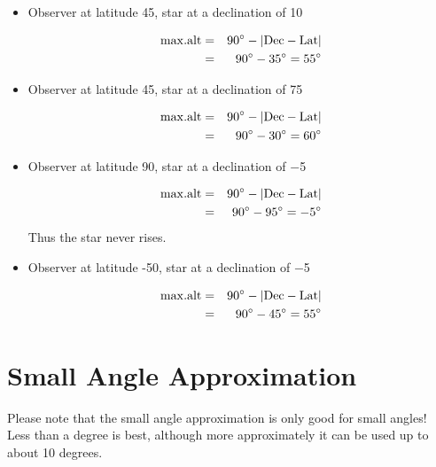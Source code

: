 \documentclass[12pt, preprint]{aastex}
\begin{document}
\begin{itemize}
  \item Observer at latitude 45\degree, star at a declination of
    10\degree

    \begin{answer}
      \begin{eqnarray}
      {\rm max. alt} &=& 90{}^\circ - \left|{\rm Dec} - {\rm
        Lat}\right| \cr
      &=& 90{}^\circ - 35{}^\circ = 55{}^\circ
      \end{eqnarray}
    \end{answer}
  \item Observer at latitude 45\degree, star at a declination of
    75\degree

    \begin{answer}
      \begin{eqnarray}
      {\rm max. alt} &=& 90{}^\circ - \left|{\rm Dec} - {\rm
        Lat}\right| \cr
      &=& 90{}^\circ - 30{}^\circ = 60{}^\circ
      \end{eqnarray}
    \end{answer}
  \item Observer at latitude 90\degree, star at a declination of
    $-$5\degree

    \begin{answer}
      \begin{eqnarray}
      {\rm max. alt} &=& 90{}^\circ - \left|{\rm Dec} - {\rm
        Lat}\right| \cr
      &=& 90{}^\circ - 95{}^\circ = -5{}^\circ
      \end{eqnarray}
      Thus the star never rises.
    \end{answer}
  \item Observer at latitude -50\degree, star at a declination of
    $-$5\degree

    \begin{answer}
      \begin{eqnarray}
      {\rm max. alt} &=& 90{}^\circ - \left|{\rm Dec} - {\rm
        Lat}\right| \cr
      &=& 90{}^\circ - 45{}^\circ = 55{}^\circ
      \end{eqnarray}
    \end{answer}
\end{itemize}

\section{Small Angle Approximation}

Please note that the small angle approximation is only good for small
angles! Less than a degree is best, although more approximately it can
be used up to about 10 degrees. 
\end{document}
